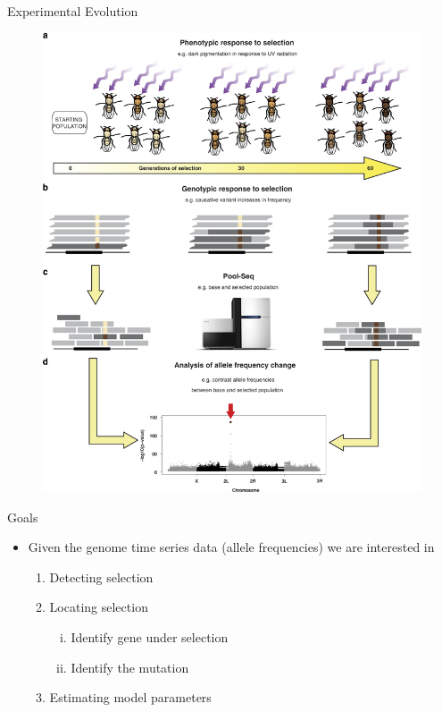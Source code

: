 \documentclass[t]{beamer} %
\begin{document}
\begin{frame}
Experimental Evolution
\begin{figure}
\includegraphics[trim={0 2.1in 0 0},clip, scale=0.6]{eg.jpg} 
\end{figure}
\end{frame}

\begin{frame}{Goals}
\begin{itemize}
\item Given the genome time series data (allele frequencies) we are interested in
\begin{enumerate}[I]
\item Detecting selection 
\item Locating selection
\begin{enumerate}[(i)]
 \item Identify gene under selection
 \item Identify the mutation 
\end{enumerate}
\item Estimating model parameters
\end{enumerate}
\end{itemize}
\end{frame}
\end{document}
